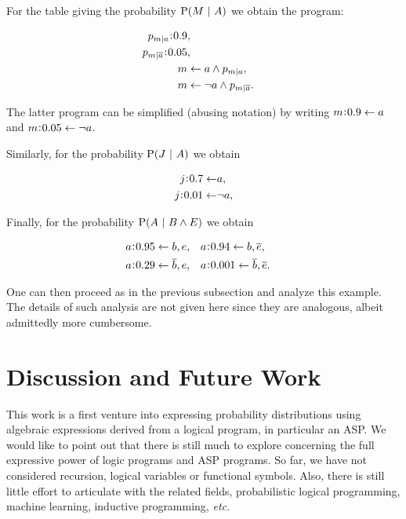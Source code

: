 \documentclass[adraft,copyright,creativecommons]{eptcs}
\newcommand{\at}[1]{\ensuremath{\!\del{#1}}}
\newcommand{\co}[1]{\ensuremath{\overline{#1}}}
\newcommand{\pr}[1]{\ensuremath{\mathrm{P}\at{#1}}}
\newcommand{\given}{\ensuremath{~\middle|~}}
\newcommand{\probfact}[2]{\ensuremath{#2\mkern-4mu:\mkern-4mu#1}}
\newcommand{\probrule}[3]{\probfact{#1}{#2} \leftarrow #3}
\newcommand{\condsymb}[2]{\ensuremath{p_{#1|#2}}}
\newcounter{remark}
\newcommand{\note}[1]{
    \stepcounter{remark}%
    {\!\!\color{red}/}\footnotemark[\arabic{remark}]\!\!%
    \footnotetext[\arabic{remark}]{{\color{red}/}#1}
}
\begin{document}
For the table giving the probability $\pr{M \given A}$ we obtain the program:

\begin{equation*}
    \begin{aligned}
        \probfact{0.9}{\condsymb{m}{a}}       & ,\cr
        \probfact{0.05}{\condsymb{m}{\co{a}}} & ,\cr
        m                                     & \leftarrow a \wedge \condsymb{m}{a},\cr
        m                                     & \leftarrow \neg a \wedge \condsymb{m}{\co{a}}.
    \end{aligned}
\end{equation*}

The latter program can be simplified (abusing notation) by writing $\probrule{0.9}{m}{a}$ and $\probrule{0.05}{m}{\neg a}$.

Similarly, for the probability $\pr{J \given A}$ we obtain

\begin{equation*}
    \begin{aligned}
        \probrule{0.7}{j}{&a},      \\
        \probrule{0.01}{j}{&\neg a},
    \end{aligned}
\end{equation*}

Finally, for the probability $\pr{A \given B \wedge E}$ we obtain

\begin{equation*}
    \begin{aligned}
        \probrule{0.95}{a}{b, e},      &  &  &
        \probrule{0.94}{a}{b, \co{e}},\cr
        \probrule{0.29}{a}{\co{b}, e}, &  &  &
        \probrule{0.001}{a}{\co{b}, \co{e}}.
    \end{aligned}
\end{equation*}

One can then proceed as in the previous subsection and analyze this example. The details of such analysis are not given here since they are analogous, albeit admittedly more cumbersome.
%
%
%
\section{Discussion and Future Work}
%
%
%
This work is a first venture into expressing probability distributions using algebraic expressions derived from a logical program, in particular an \ac{ASP}.
We would like to point out that there is still much to explore concerning the full expressive power of logic programs and \ac{ASP} programs. So far, we have not considered recursion, logical variables or functional symbols. Also, there is still little effort to articulate with the  related fields, probabilistic logical programming, machine learning, inductive programming, \emph{etc.}
\end{document}
